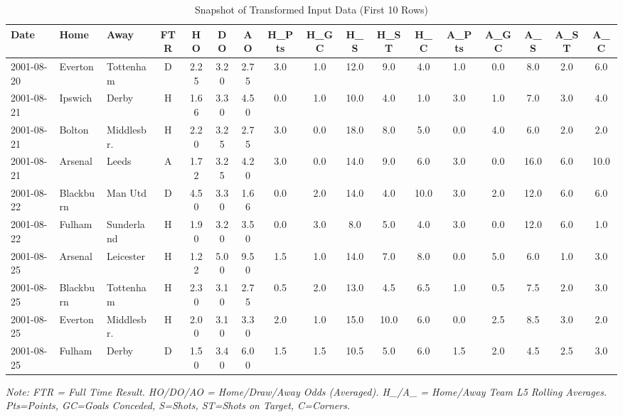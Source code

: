 \documentclass[pdflatex,sn-basic]{sn-jnl}
\begin{document}
\begin{table}[htbp]
\centering
\caption{Snapshot of Transformed Input Data (First 10 Rows)}
\label{tab:data_snapshot}
\setlength{\tabcolsep}{1.5pt}
\scriptsize
\begin{tabular}{@{}lllc|ccc|ccccc|ccccc@{}}
\toprule
\textbf{Date} & \textbf{Home} & \textbf{Away} & \textbf{FTR} & \textbf{HO} & \textbf{DO} & \textbf{AO} & \textbf{H\_Pts} & \textbf{H\_GC} & \textbf{H\_S} & \textbf{H\_ST} & \textbf{H\_C} & \textbf{A\_Pts} & \textbf{A\_GC} & \textbf{A\_S} & \textbf{A\_ST} & \textbf{A\_C} \\ \midrule
2001-08-20 & Everton & Tottenham & D & 2.25 & 3.20 & 2.75 & 3.0 & 1.0 & 12.0 & 9.0 & 4.0 & 1.0 & 0.0 & 8.0 & 2.0 & 6.0 \\
2001-08-21 & Ipswich & Derby & H & 1.66 & 3.30 & 4.50 & 0.0 & 1.0 & 10.0 & 4.0 & 1.0 & 3.0 & 1.0 & 7.0 & 3.0 & 4.0 \\
2001-08-21 & Bolton & Middlesbr. & H & 2.20 & 3.25 & 2.75 & 3.0 & 0.0 & 18.0 & 8.0 & 5.0 & 0.0 & 4.0 & 6.0 & 2.0 & 2.0 \\
2001-08-21 & Arsenal & Leeds & A & 1.72 & 3.25 & 4.20 & 3.0 & 0.0 & 14.0 & 9.0 & 6.0 & 3.0 & 0.0 & 16.0 & 6.0 & 10.0 \\
2001-08-22 & Blackburn & Man Utd & D & 4.50 & 3.30 & 1.66 & 0.0 & 2.0 & 14.0 & 4.0 & 10.0 & 3.0 & 2.0 & 12.0 & 6.0 & 6.0 \\
2001-08-22 & Fulham & Sunderland & H & 1.90 & 3.20 & 3.50 & 0.0 & 3.0 & 8.0 & 5.0 & 4.0 & 3.0 & 0.0 & 12.0 & 6.0 & 1.0 \\
2001-08-25 & Arsenal & Leicester & H & 1.22 & 5.00 & 9.50 & 1.5 & 1.0 & 14.0 & 7.0 & 8.0 & 0.0 & 5.0 & 6.0 & 1.0 & 3.0 \\
2001-08-25 & Blackburn & Tottenham & H & 2.30 & 3.10 & 2.75 & 0.5 & 2.0 & 13.0 & 4.5 & 6.5 & 1.0 & 0.5 & 7.5 & 2.0 & 3.0 \\
2001-08-25 & Everton & Middlesbr. & H & 2.00 & 3.10 & 3.30 & 2.0 & 1.0 & 15.0 & 10.0 & 6.0 & 0.0 & 2.5 & 8.5 & 3.0 & 2.0 \\
2001-08-25 & Fulham & Derby & D & 1.50 & 3.40 & 6.00 & 1.5 & 1.5 & 10.5 & 5.0 & 6.0 & 1.5 & 2.0 & 4.5 & 2.5 & 3.0 \\ \bottomrule
\end{tabular}%
\vspace{0.5em}
\raggedright
\small{\textit{Note: FTR = Full Time Result. HO/DO/AO = Home/Draw/Away Odds (Averaged). H\_/A\_ = Home/Away Team L5 Rolling Averages. Pts=Points, GC=Goals Conceded, S=Shots, ST=Shots on Target, C=Corners.}}
\end{table}
\end{document}
